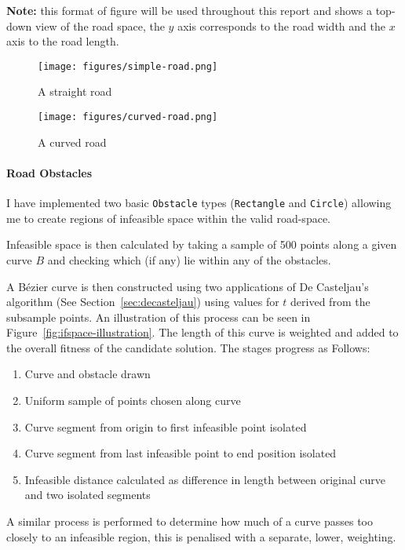 \textbf{Note:} this format of figure will be used throughout this report and shows a top-down view of the road space, the $y$ axis corresponds to the road width and the $x$ axis to the road length.

\begin{figure}[ht]
  \centering
  \texttt{[image: figures/simple-road.png]}
  \caption{\label{fig:simple-road} A straight road}
\end{figure}

\begin{figure}[ht]
  \centering
  \texttt{[image: figures/curved-road.png]}
  \caption{\label{fig:curved-road} A curved road}
\end{figure}

\paragraph{Road Obstacles}

I have implemented two basic \texttt{Obstacle} types (\texttt{Rectangle} and \texttt{Circle}) allowing me to create regions of infeasible space within the valid road-space.

Infeasible space is then calculated by taking a sample of 500 points along a given curve $B$ and checking which (if any) lie within any of the obstacles.

A Bézier curve is then constructed using two applications of De Casteljau's algorithm (See Section~\ref{sec:decasteljau}) using values for $t$ derived from the subsample points. An illustration of this process can be seen in Figure~\ref{fig:ifspace-illustration}. The length of this curve is weighted and added to the overall fitness of the candidate solution. The stages progress as Follows:

\begin{enumerate}
  \item Curve and obstacle drawn
  \item Uniform sample of points chosen along curve
  \item Curve segment from origin to first infeasible point isolated
  \item Curve segment from last infeasible point to end position isolated
  \item Infeasible distance calculated as difference in length between original curve and two isolated segments
\end{enumerate}


A similar process is performed to determine how much of a curve passes too closely to an infeasible region, this is penalised with a separate, lower, weighting.

